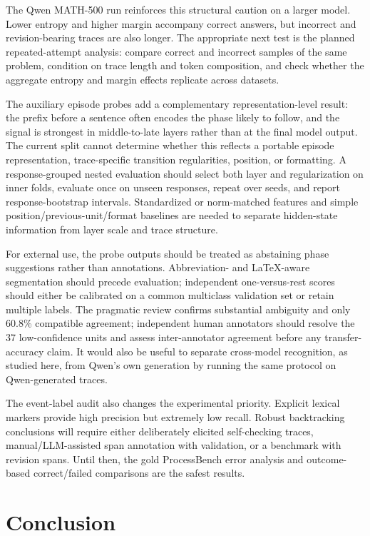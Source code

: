 \documentclass[manuscript,screen,review]{jair}
\begin{document}
The Qwen MATH-500 run reinforces this structural caution on a larger model.
Lower entropy and higher margin accompany correct answers, but incorrect and
revision-bearing traces are also longer.  The appropriate next test is the
planned repeated-attempt analysis: compare correct and incorrect samples of
the same problem, condition on trace length and token composition, and check
whether the aggregate entropy and margin effects replicate across datasets.

The auxiliary episode probes add a complementary representation-level result:
the prefix before a sentence often encodes the phase likely to follow, and the
signal is strongest in middle-to-late layers rather than at the final model
output.  The current split cannot determine whether this reflects a portable
episode representation, trace-specific transition regularities, position, or
formatting.  A response-grouped nested evaluation should select both layer and
regularization on inner folds, evaluate once on unseen responses, repeat over
seeds, and report response-bootstrap intervals.  Standardized or norm-matched
features and simple position/previous-unit/format baselines are needed to
separate hidden-state information from layer scale and trace structure.

For external use, the probe outputs should be treated as abstaining phase
suggestions rather than annotations.  Abbreviation- and LaTeX-aware
segmentation should precede evaluation; independent one-versus-rest scores
should either be calibrated on a common multiclass validation set or retain
multiple labels.  The pragmatic review confirms substantial ambiguity and
only 60.8\% compatible agreement; independent human annotators should resolve
the 37 low-confidence units and assess inter-annotator agreement before any
transfer-accuracy claim.  It would also be useful to
separate cross-model recognition, as studied here, from Qwen's own generation
by running the same protocol on Qwen-generated traces.

The event-label audit also changes the experimental priority.  Explicit
lexical markers provide high precision but extremely low recall.  Robust
backtracking conclusions will require either deliberately elicited
self-checking traces, manual/LLM-assisted span annotation with validation, or
a benchmark with revision spans.  Until then, the gold ProcessBench error
analysis and outcome-based correct/failed comparisons are the safest results.

\section{Conclusion}
\end{document}
